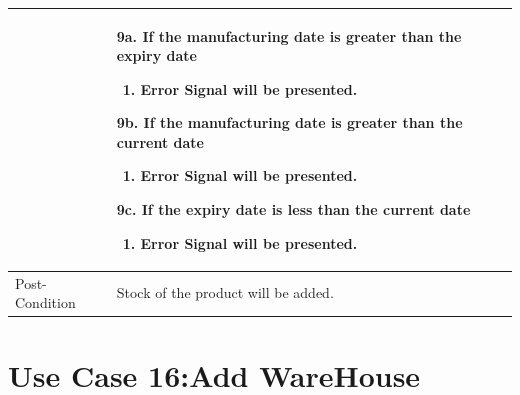 \documentclass[12pt,a4paper]{report}
\begin{document}
\begin{tabular}{ | m{3cm} | m{12cm}| } \hline
& 9a. If the manufacturing date is greater than the expiry date
	\begin{enumerate}
		\item Error Signal will be presented.
	\end{enumerate}
9b. If the manufacturing date is greater than the current date
	\begin{enumerate}
		\item Error Signal will be presented.
	\end{enumerate}
9c. If the expiry date is less than the current date
	\begin{enumerate}
		\item Error Signal will be presented.
	\end{enumerate}
\\ \hline
Post-Condition &  Stock of the product will be added. \\ \hline
\end{tabular}
\section{Use Case 16:Add WareHouse}
\end{document}
